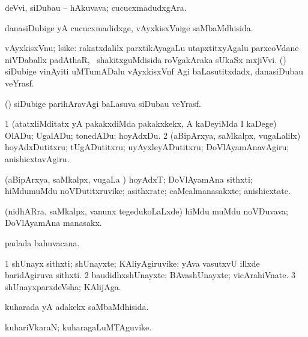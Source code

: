 \bentry
{} 
\gl{\nA}
\expl{}
\bmng
 deVvi, siDubau -- hAkuvava; cucucxmadudxgAra. 
\emng
\eentry

\bentry
{} 
\gl{\gu}
\expl{}
\bmng
 danasiDubige yA cucucxmadidxge, vAyxkisxVnige saMbaMdhisida. 
\emng
\eentry

\bentry 
{} 
\gl{\nA}
\expl{}
\bmng
vAyxkisxVnu; lsike: 
\banum
{} rakatxdalilx parxtikAyagaLu utapxtitxyAgalu parxcoVdane niVDaballx padAthaR, \sA\ shakitxguMdisida roVgakAraka sUkaSx mxjiVvi. 
 (\ca) siDubige vinAyiti uMTumADalu vAyxkisxVnf Agi baLasutitxdadx, danasiDubau veYrasf. 
\eanum
\emng
\eentry

\bentry
{} 
\gl{\nA}
\bmng
 (\veYshA) siDubige parihAravAgi baLasuva siDubau veYrasf. 
\emng
\eentry

\bentry
{} 
\gl{\akirx}
\expl{}
\bmng
\bnum
\num{1} (atatxliMditatx yA pakakxdiMda pakakxkekx, A kaDeyiMda I kaDege) OlADu; UgalADu; tonedADu; hoyAdxDu. 
\num{2} (aBipArxya, saMkalpx, \mo vugaLalilx) hoyAdxDutitxru; tUgADutitxru; uyAyxleyADutitxru; DoVlAyamAnavAgiru; anishicxtavAgiru. 
\enum
\emng
\eentry

\bentry
{} 
\gl{\nA}
\expl{}
\bmng
 (aBipArxya, saMkalpx, \mo vugaLa \vi) hoyAdxT; DoVlAyamAna sithxti; hiMdumuMdu noVDutitxruvike; asithxrate; caMcalmanasakxte; anishicxtate. 
\emng
\eentry

\bentry
{} 
\gl{\nA}
\expl{}
\bmng
 (nidhARra, saMkalpx, \mo vanunx tegedukoLaLxde) hiMdu muMdu noVDuvava; DoVlAyamAna manasakx. 
\emng
\eentry

\bentry
{} 
\gl{\nA}
\expl{}
\bmng
  padada bahuvacana. 
\emng
\eentry

\bentry
{} 
\gl{\nA}
\bmng
\bnum
\num{1} shUnayx sithxti; shUnayxte; KAliyAgiruvike; yAva vasutxvU illxde baridAgiruva sithxti. 
\num{2} baudidhxshUnayxte; BAvashUnayxte; vicArahiVnate. 
\num{3} shUnayxparxdeVsha; KAlijAga. 
\enum
\emng
\eentry

\bentry
{} 
\gl{\gu}
\expl{}
\bmng
 kuharada yA adakekx saMbaMdhisida. 
\emng
\eentry

\bentry
{} 
\gl{\nA}
\expl{}
\bmng
 kuhariVkaraN; kuharagaLuMTAguvike. 
\emng
\eentry

